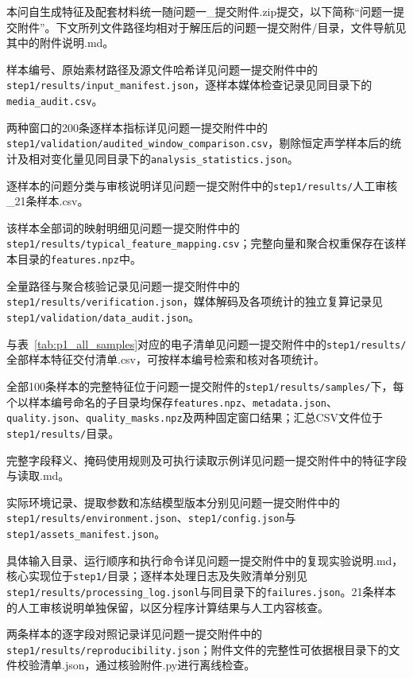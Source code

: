 本问自生成特征及配套材料统一随\textnormal{问题一\_提交附件.zip}提交，以下简称“问题一提交附件”。下文所列文件路径均相对于解压后的\textnormal{问题一提交附件/}目录，文件导航见其中的\textnormal{附件说明.md}。

样本编号、原始素材路径及源文件哈希详见问题一提交附件中的\nolinkurl{step1/results/input_manifest.json}，逐样本媒体检查记录见同目录下的\nolinkurl{media_audit.csv}。

两种窗口的200条逐样本指标详见问题一提交附件中的\nolinkurl{step1/validation/audited_window_comparison.csv}，剔除恒定声学样本后的统计及相对变化量见同目录下的\nolinkurl{analysis_statistics.json}。

逐样本的问题分类与审核说明详见问题一提交附件中的\nolinkurl{step1/results/}\textnormal{人工审核\_21条样本.csv}。

该样本全部词的映射明细见问题一提交附件中的\nolinkurl{step1/results/typical_feature_mapping.csv}；完整向量和聚合权重保存在该样本目录的\nolinkurl{features.npz}中。

全量路径与聚合核验记录见问题一提交附件中的\nolinkurl{step1/results/verification.json}，媒体解码及各项统计的独立复算记录见\nolinkurl{step1/validation/data_audit.json}。

与表~\ref{tab:p1_all_samples}对应的电子清单见问题一提交附件中的\nolinkurl{step1/results/}\textnormal{全部样本特征交付清单.csv}，可按样本编号检索和核对各项统计。

全部100条样本的完整特征位于问题一提交附件的\nolinkurl{step1/results/samples/}下，每个以样本编号命名的子目录均保存\nolinkurl{features.npz}、\nolinkurl{metadata.json}、\nolinkurl{quality.json}、\nolinkurl{quality_masks.npz}及两种固定窗口结果；汇总CSV文件位于\nolinkurl{step1/results/}目录。

完整字段释义、掩码使用规则及可执行读取示例详见问题一提交附件中的\textnormal{特征字段与读取.md}。

实际环境记录、提取参数和冻结模型版本分别见问题一提交附件中的\nolinkurl{step1/results/environment.json}、\nolinkurl{step1/config.json}与\nolinkurl{step1/assets_manifest.json}。

具体输入目录、运行顺序和执行命令详见问题一提交附件中的\textnormal{复现实验说明.md}，核心实现位于\nolinkurl{step1/}目录；逐样本处理日志及失败清单分别见\nolinkurl{step1/results/processing_log.jsonl}与同目录下的\nolinkurl{failures.json}。21条样本的人工审核说明单独保留，以区分程序计算结果与人工内容核查。

两条样本的逐字段对照记录详见问题一提交附件中的\nolinkurl{step1/results/reproducibility.json}；附件文件的完整性可依据根目录下的\textnormal{文件校验清单.json}，通过\textnormal{核验附件.py}进行离线检查。
